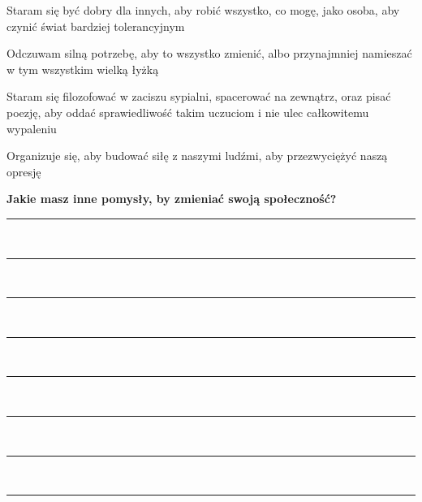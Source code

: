 \begin{multicols}{2}
\begin{checkboxlist}
		\item Staram się być dobry dla innych, aby robić wszystko, co mogę, jako osoba, aby czynić świat bardziej tolerancyjnym
		\item Odczuwam silną potrzebę, aby to wszystko zmienić, albo przynajmniej namieszać w tym wszystkim wielką łyżką
		\item Staram się filozofować w zaciszu sypialni, spacerować na zewnątrz, oraz pisać poezję, aby oddać sprawiedliwość takim uczuciom i nie ulec całkowitemu wypaleniu
		\item Organizuje się, aby budować siłę z naszymi ludźmi, aby przezwyciężyć naszą opresję
	\end{checkboxlist}
\end{multicols}

\noindent\textcolor{ProcessBlue}{\textbf{\LARGE{Jakie masz inne pomysły, by zmieniać swoją społeczność?}}}\\

\noindent\rule{\textwidth}{1pt}\\
\noindent\rule{\textwidth}{1pt}\\
\noindent\rule{\textwidth}{1pt}\\
\noindent\rule{\textwidth}{1pt}\\
\noindent\rule{\textwidth}{1pt}\\
\noindent\rule{\textwidth}{1pt}\\
\noindent\rule{\textwidth}{1pt}\\
\noindent\rule{\textwidth}{1pt}\\\\